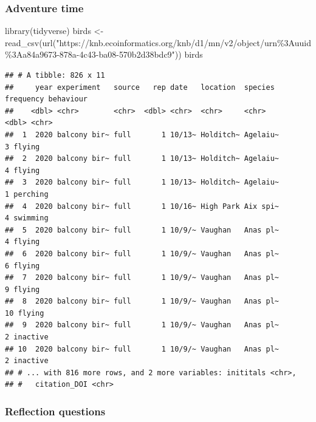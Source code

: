 \documentclass[
]{book}
\newenvironment{Shaded}{\begin{snugshade}}{\end{snugshade}}
\newcommand{\FunctionTok}[1]{\textcolor[rgb]{0.00,0.00,0.00}{#1}}
\newcommand{\NormalTok}[1]{#1}
\newcommand{\OtherTok}[1]{\textcolor[rgb]{0.56,0.35,0.01}{#1}}
\newcommand{\StringTok}[1]{\textcolor[rgb]{0.31,0.60,0.02}{#1}}
\begin{document}
\hypertarget{adventure-time-4}{%
\subsubsection*{Adventure time}\label{adventure-time-4}}

\begin{Shaded}
\begin{Highlighting}[]
\FunctionTok{library}\NormalTok{(tidyverse)}
\NormalTok{birds }\OtherTok{\textless{}{-}} \FunctionTok{read\_csv}\NormalTok{(}\FunctionTok{url}\NormalTok{(}\StringTok{"https://knb.ecoinformatics.org/knb/d1/mn/v2/object/urn\%3Auuid\%3Aa84a9673{-}878a{-}4c43{-}ba08{-}570b2d38bdc9"}\NormalTok{))}
\NormalTok{birds}
\end{Highlighting}
\end{Shaded}

\begin{verbatim}
## # A tibble: 826 x 11
##     year experiment   source   rep date   location  species  frequency behaviour
##    <dbl> <chr>        <chr>  <dbl> <chr>  <chr>     <chr>        <dbl> <chr>    
##  1  2020 balcony bir~ full       1 10/13~ Holditch~ Agelaiu~         3 flying   
##  2  2020 balcony bir~ full       1 10/13~ Holditch~ Agelaiu~         4 flying   
##  3  2020 balcony bir~ full       1 10/13~ Holditch~ Agelaiu~         1 perching 
##  4  2020 balcony bir~ full       1 10/16~ High Park Aix spi~         4 swimming 
##  5  2020 balcony bir~ full       1 10/9/~ Vaughan   Anas pl~         4 flying   
##  6  2020 balcony bir~ full       1 10/9/~ Vaughan   Anas pl~         6 flying   
##  7  2020 balcony bir~ full       1 10/9/~ Vaughan   Anas pl~         9 flying   
##  8  2020 balcony bir~ full       1 10/9/~ Vaughan   Anas pl~        10 flying   
##  9  2020 balcony bir~ full       1 10/9/~ Vaughan   Anas pl~         2 inactive 
## 10  2020 balcony bir~ full       1 10/9/~ Vaughan   Anas pl~         2 inactive 
## # ... with 816 more rows, and 2 more variables: inititals <chr>,
## #   citation_DOI <chr>
\end{verbatim}

\hypertarget{reflection-questions-4}{%
\subsubsection*{Reflection questions}\label{reflection-questions-4}}
\end{document}
